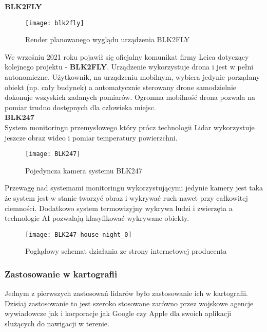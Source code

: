 \textbf{BLK2FLY}

\begin{figure}[h]
    \centering
    \texttt{[image: blk2fly]}
    \caption{Render planowanego wyglądu urządzenia BLK2FLY \cite{blk2fly}}
    \label{fig:blk2fly}
\end{figure}

We wrześniu 2021 roku pojawił się oficjalny komunikat firmy Leica dotyczący kolejnego projektu - \textbf{BLK2FLY}. Urządzenie wykorzystuje drona i jest w pełni autonomiczne. Użytkownik, na urządzeniu mobilnym, wybiera jedynie porządany obiekt (np. cały budynek) a automatycznie sterowany drone samodzielnie dokonuje wszyskich zadanych pomiarów. Ogromna mobilność drona pozwala na pomiar trudno dostępnych dla człowieka miejsc.\\

\textbf{BLK247}\\
System monitoringu przemysłowego który prócz technologii Lidar wykorzystuje jeszcze obraz wideo i pomiar temperatury powierzchni.\\
\begin{figure}[h]
    \centering
    \texttt{[image: BLK247]}
    \caption{Pojedyncza kamera systemu BLK247 \cite{blk247}}
    \label{fig:blk247}
\end{figure}
Przewagę nad systemami monitoringu wykorzystującymi jedynie kamery jest taka że system jest w stanie tworzyć obraz i wykrywać ruch nawet przy całkowitej ciemności. Dodatkowo system termowizyjny wykrywa ludzi i zwierzęta a technologie AI pozwalają klasyfikować wykrywane obiekty.

\begin{figure}[h]
    \centering
    \texttt{[image: BLK247-house-night\_0]}
    \caption{Poglądowy schemat działania ze strony internetowej producenta \cite{blk247}}
    \label{fig:house-night}
\end{figure}

\newpage
\subsubsection{Zastosowanie w kartografii}
Jednym z pierwszych zastosowań lidarów było zastosowanie ich w kartografii. Dzisiaj zastosowanie to jest szeroko stosowane zarówno przez wojskowe agencje wywiadowcze jak i korporacje jak Google czy Apple dla swoich aplikacji służących do nawigacji w terenie.\\

